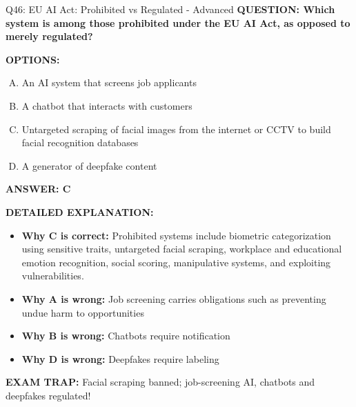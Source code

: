 \documentclass[8pt]{beamer}
\begin{document}
\begin{frame}[shrink=6]{Q46: EU AI Act: Prohibited vs Regulated - Advanced}
\fontsize{6.5}{7.5}\selectfont
\textbf{QUESTION: Which system is among those prohibited under the EU AI Act, as opposed to merely regulated?}

\vspace{0.1cm}
\textbf{OPTIONS:}
\begin{enumerate}[A.]
\item An AI system that screens job applicants
\item A chatbot that interacts with customers
\item Untargeted scraping of facial images from the internet or CCTV to build facial recognition databases
\item A generator of deepfake content
\end{enumerate}

\vspace{0.1cm}
\textcolor{myblue}{\textbf{ANSWER: C}}

\vspace{0.1cm}
\textbf{DETAILED EXPLANATION:}
\begin{itemize}
\item \textbf{Why C is correct:} Prohibited systems include biometric categorization using sensitive traits, untargeted facial scraping, workplace and educational emotion recognition, social scoring, manipulative systems, and exploiting vulnerabilities.
\item \textbf{Why A is wrong:} Job screening carries obligations such as preventing undue harm to opportunities
\item \textbf{Why B is wrong:} Chatbots require notification
\item \textbf{Why D is wrong:} Deepfakes require labeling
\end{itemize}

\textcolor{myred}{\textbf{EXAM TRAP:}} Facial scraping banned; job-screening AI, chatbots and deepfakes regulated!
\end{frame}
\end{document}
